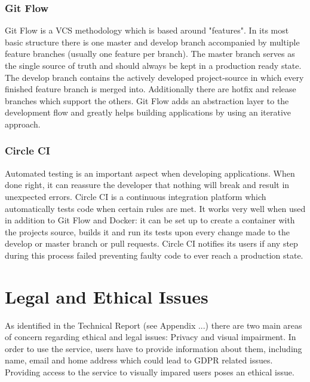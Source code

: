 \subsubsection{Git Flow}
Git Flow is a VCS methodology which is based around "features". In its most basic structure there is one master and develop branch accompanied by multiple feature branches (usually one feature per branch). The master branch serves as the single source of truth and should always be kept in a production ready state. The develop branch contains the actively developed project-source in which every finished feature branch is merged into. Additionally there are hotfix and release branches which support the others. Git Flow adds an abstraction layer to the development flow and greatly helps building applications by using an iterative approach.

\subsubsection{Circle CI}
Automated testing is an important aspect when developing applications. When done right, it can reassure the developer that nothing will break and result in unexpected errors. Circle CI is a continuous integration platform which automatically tests code when certain rules are met. It works very well when used in addition to Git Flow and Docker: it can be set up to create a container with the projects source, builds it and run its tests upon every change made to the develop or master branch or pull requests. Circle CI notifies its users if any step during this process failed preventing faulty code to ever reach a production state.

\section{Legal and Ethical Issues}
As identified in the Technical Report (see Appendix ...) there are two main areas of concern regarding ethical and legal issues: Privacy and visual impairment. In order to use the service, users have to provide information about them, including name, email and home address which could lead to GDPR related issues. Providing access to the service to visually impared users poses an ethical issue.
